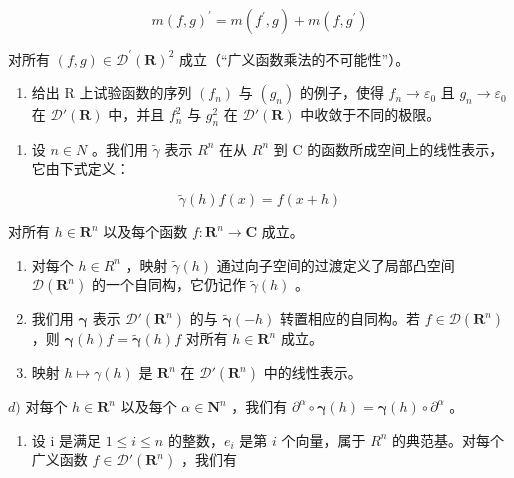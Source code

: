 \[
m (f, g) ^ {\prime} = m \left(f ^ {\prime}, g\right) + m \left(f, g ^ {\prime}\right)
\]

对所有 \((f,g)\in\mathcal{D}^{\prime}(\mathbf{R})^{2}\) 成立（“广义函数乘法的不可能性”）。

\begin{enumerate}
\def\labelenumi{\alph{enumi})}
\setcounter{enumi}{3}
\tightlist
\item
  给出 R 上试验函数的序列 \((f_{n})\) 与 \((g_{n})\) 的例子，使得 \(f_{n} \to \varepsilon_{0}\) 且 \(g_{n} \to \varepsilon_{0}\) 在 \(\mathcal{D}'(\mathbf{R})\) 中，并且 \(f_{n}^{2}\) 与 \(g_{n}^{2}\) 在 \(\mathcal{D}'(\mathbf{R})\) 中收敛于不同的极限。
\end{enumerate}

\begin{enumerate}
\def\labelenumi{\arabic{enumi})}
\setcounter{enumi}{6}
\tightlist
\item
  设 \(n \in N\) 。我们用 \(\widetilde{\gamma}\) 表示 \(R^{n}\) 在从 \(R^{n}\) 到 C 的函数所成空间上的线性表示，它由下式定义：
\end{enumerate}

\[
\widetilde {\gamma} (h) f (x) = f (x + h)
\]

对所有 \(h \in \mathbf{R}^n\) 以及每个函数 \(f: \mathbf{R}^n \to \mathbf{C}\) 成立。

\begin{enumerate}
\def\labelenumi{\alph{enumi})}
\item
  对每个 \(h \in R^{n}\) ，映射 \(\widetilde{\gamma}(h)\) 通过向子空间的过渡定义了局部凸空间 \(\mathcal{D}(\mathbf{R}^{n})\) 的一个自同构，它仍记作 \(\widetilde{\gamma}(h)\) 。
\item
  我们用 \(\pmb{\gamma}\) 表示 \(\mathcal{D}'(\mathbf{R}^n)\) 的与 \(\widetilde{\pmb{\gamma}}(-h)\) 转置相应的自同构。若 \(f \in \mathcal{D}(\mathbf{R}^n)\) ，则 \(\pmb{\gamma}(h)f = \widetilde{\pmb{\gamma}}(h)f\) 对所有 \(h \in \mathbf{R}^n\) 成立。
\item
  映射 \(h \mapsto \gamma(h)\) 是 \(\mathbf{R}^{n}\) 在 \(\mathcal{D}'(\mathbf{R}^{n})\) 中的线性表示。
\end{enumerate}

\(d)\) 对每个 \(h \in \mathbf{R}^n\) 以及每个 \(\alpha \in \mathbf{N}^n\) ，我们有 \(\partial^\alpha \circ \boldsymbol{\gamma}(h) = \boldsymbol{\gamma}(h) \circ \partial^\alpha\) 。

\begin{enumerate}
\def\labelenumi{\alph{enumi})}
\setcounter{enumi}{4}
\tightlist
\item
  设 i 是满足 \(1 \leqslant i \leqslant n\) 的整数，\(e_{i}\) 是第 \(i\) 个向量，属于 \(R^{n}\) 的典范基。对每个广义函数 \(f \in \mathcal{D}'(\mathbf{R}^{n})\) ，我们有
\end{enumerate}

